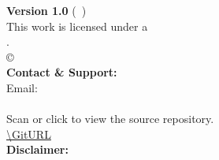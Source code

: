 \clearpage
\thispagestyle{empty}
\vspace*{\fill} 

\begin{center}
\begin{minipage}{0.85\textwidth}
  \centering
  \footnotesize\color{gray} 
  
  \textbf{Version 1.0} (\VersionMonth\ \Year)\\[0.3cm]
  This work is licensed under a \\ \textbf{\License}.\\[0.15cm]
  \copyright\ \Year\ \Author\\[0.4cm]
  
  \textbf{Contact \& Support:}\\
  Email: \href{mailto:\AuthorEmail}{\AuthorEmail} \\[0.4cm]
  
  \qrcode[height=2cm]{\GitURL} \\[0.2cm]
  
  Scan or click to view the source repository.\\
  \url{\GitURL} \\[0.6cm]
  
  \textbf{Disclaimer:}\\
  \Disclaimer
  
\end{minipage}
\end{center}

\vspace*{\fill}
\clearpage